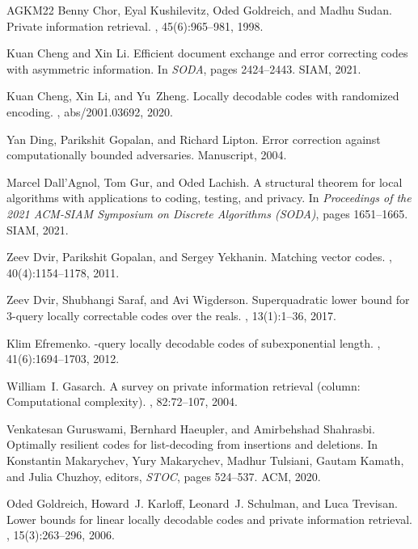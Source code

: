 \documentclass[10pt,a4paper]{article}
\theoremstyle{remark}
\begin{document}
\begin{thebibliography}{AGKM22}
Benny Chor, Eyal Kushilevitz, Oded Goldreich, and Madhu Sudan.
\newblock Private information retrieval.
, 45(6):965--981, 1998.

Kuan Cheng and Xin Li.
\newblock Efficient document exchange and error correcting codes with
  asymmetric information.
\newblock In {\em {SODA}}, pages 2424--2443. {SIAM}, 2021.

Kuan Cheng, Xin Li, and Yu~Zheng.
\newblock Locally decodable codes with randomized encoding.
, abs/2001.03692, 2020.

Yan Ding, Parikshit Gopalan, and Richard Lipton.
\newblock Error correction against computationally bounded adversaries.
\newblock Manuscript, 2004.

Marcel Dall'Agnol, Tom Gur, and Oded Lachish.
\newblock A structural theorem for local algorithms with applications to
  coding, testing, and privacy.
\newblock In {\em Proceedings of the 2021 ACM-SIAM Symposium on Discrete
  Algorithms (SODA)}, pages 1651--1665. SIAM, 2021.

Zeev Dvir, Parikshit Gopalan, and Sergey Yekhanin.
\newblock Matching vector codes.
, 40(4):1154--1178, 2011.

Zeev Dvir, Shubhangi Saraf, and Avi Wigderson.
\newblock Superquadratic lower bound for 3-query locally correctable codes over
  the reals.
, 13(1):1--36, 2017.

Klim Efremenko.
-query locally decodable codes of subexponential length.
, 41(6):1694--1703, 2012.

William~I. Gasarch.
\newblock A survey on private information retrieval (column: Computational
  complexity).
, 82:72--107, 2004.

Venkatesan Guruswami, Bernhard Haeupler, and Amirbehshad Shahrasbi.
\newblock Optimally resilient codes for list-decoding from insertions and
  deletions.
\newblock In Konstantin Makarychev, Yury Makarychev, Madhur Tulsiani, Gautam
  Kamath, and Julia Chuzhoy, editors, {\em {STOC}}, pages 524--537. {ACM},
  2020.

Oded Goldreich, Howard~J. Karloff, Leonard~J. Schulman, and Luca Trevisan.
\newblock Lower bounds for linear locally decodable codes and private
  information retrieval.
, 15(3):263--296, 2006.


\end{thebibliography}
\end{document}
